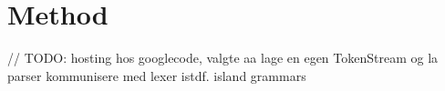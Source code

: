 \chapter{Method}



// TODO: 
hosting hos googlecode, valgte aa lage en egen TokenStream og la parser
kommunisere med lexer istdf. island grammars